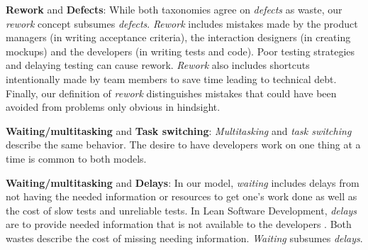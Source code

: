 


\textbf{Rework} and \textbf{Defects}: While both taxonomies agree on \textit{defects} as waste, our \textit{rework} concept subsumes \textit{defects}. \textit{Rework} includes mistakes made by the product managers (in writing acceptance criteria), the interaction designers (in creating mockups) and the developers (in writing tests and code). Poor testing strategies and delaying testing can cause rework. \textit{Rework} also includes shortcuts intentionally made by team members to save time leading to technical debt. Finally, our definition of \textit{rework} distinguishes mistakes that could have been avoided from problems only obvious in hindsight. 

\textbf{Waiting/multitasking} and \textbf{Task switching}: \textit{Multitasking} and \textit{task switching} describe the same behavior. The desire to have developers work on one thing at a time is common to both models. 

\textbf{Waiting/multitasking} and \textbf{Delays}: In our model, \textit{waiting} includes delays from not having the needed information or resources to get one's work done as well as the cost of slow tests and unreliable tests. In Lean Software Development, \textit{delays} are  to provide needed information that is not available to the developers \cite{PoppendieckConceptToCash}. Both wastes describe the cost of missing needing information. \textit{Waiting} subsumes \textit{delays}.

